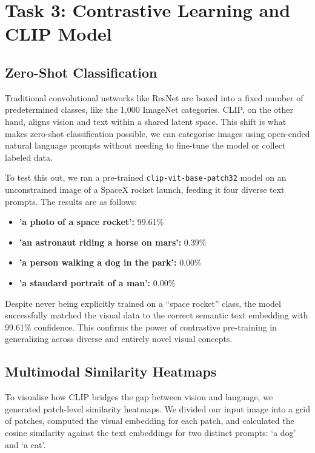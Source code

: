 \documentclass{article}
\begin{document}
    \section{Task 3: Contrastive Learning and CLIP Model}
    
    \subsection{Zero-Shot Classification}
    Traditional convolutional networks like ResNet are boxed into a fixed number of predetermined classes, like the 1,000 ImageNet categories. CLIP, on the other hand, aligns vision and text within a shared latent space. This shift is what makes zero-shot classification possible, we can categorise images using open-ended natural language prompts without needing to fine-tune the model or collect labeled data.
    
    To test this out, we ran a pre-trained \texttt{clip-vit-base-patch32} model on an unconstrained image of a SpaceX rocket launch, feeding it four diverse text prompts. The results are as follows:
    
    \begin{itemize}
        \item \textbf{'a photo of a space rocket':} 99.61\%
        \item \textbf{'an astronaut riding a horse on mars':} 0.39\%
        \item \textbf{'a person walking a dog in the park':} 0.00\%
        \item \textbf{'a standard portrait of a man':} 0.00\%
    \end{itemize}
    
    Despite never being explicitly trained on a ``space rocket'' class, the model successfully matched the visual data to the correct semantic text embedding with 99.61\% confidence. This confirms the power of contrastive pre-training in generalizing across diverse and entirely novel visual concepts.
    
    \subsection{Multimodal Similarity Heatmaps}
    To visualise how CLIP bridges the gap between vision and language, we generated patch-level similarity heatmaps. We divided our input image into a grid of patches, computed the visual embedding for each patch, and calculated the cosine similarity against the text embeddings for two distinct prompts: `a dog' and `a cat'.
    
\end{document}

